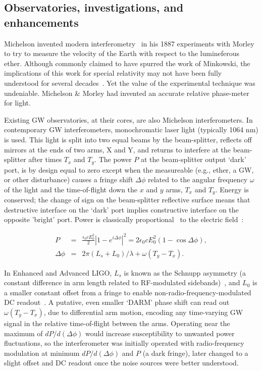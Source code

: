 
        \subsection{Observatories, investigations, and enhancements}
        \label{methods}

	Michelson invented modern interferometry~\cite{michelson} in his 1887 experiments with Morley to try to measure the velocity of the Earth with respect to the lumineferous ether.
Although commonly claimed to have spurred the work of Minkowski, the implications of this work for special relativity may not have been fully understood for several decades~\cite{CollinsGravityGhost}.
Yet the value of the experimental technique was undeniable.
Michelson \& Morley had invented an accurate relative phase-meter for light.

Existing GW observatories, at their cores, are also Michelson interferometers. 
In contemporary GW interferometers, monochromatic laser light (typically 1064 nm) is used.
This light is split into two equal beams by the beam-splitter, reflects off mirrors at the ends of two arms, X and Y, and returns to interfere at the beam-splitter after times $T_x$ and $T_y$.
The power $P$ at the beam-splitter output `dark' port, is by design equal to zero except when the measureable (e.g., ether, a GW, or other disturbance) causes a fringe shift $\Delta \phi$ related to the angular frequency $\omega$ of the light and the time-of-flight down the $x$ and $y$ arms, $T_x$ and $T_y$. 
Energy is conserved; the change of sign on the beam-splitter reflective surface means that destructive interface on the `dark' port implies constructive interface on the opposite 'bright' port.
Power is classically proportional~\cite{JacksonEM} to the electric field~\cite{Saulson}:

\begin{eqnarray}
P &=& \frac{\epsilon_0 c E_0^2}{2} \left| 1 - e^{i \Delta \phi}\right|^2 = 2 \epsilon_0 c E_0^2 (1 - \cos \Delta {\phi}),
\label{michelson-interferometry-eq}\\
\Delta \phi &=& 2\pi (L_s + L_0) /\lambda + \omega (T_y - T_x).
\end{eqnarray}

In Enhanced and Advanced LIGO, $L_s$ is known as the Schnupp asymmetry (a constant difference in arm length related to RF-modulated sidebands)~\cite{AdhikariThesis}, and $L_0$ is a smaller constant offset from a fringe to enable non-radio-frequency-modulated DC readout~\cite{FrickeThesis}.
A putative, even smaller `DARM' phase shift can read out $\omega (T_y -T_x)$, due to differential arm motion, encoding any time-varying GW signal in the relative time-of-flight between the arms. 
Operating near the maximum of $dP/d(\Delta\phi)$ would increase susceptibility to unwanted power fluctuations, so the interferometer was initially operated with radio-frequency modulation at minimum $dP/d(\Delta\phi)$ and  $P$ (a dark fringe), later changed to a slight offset and DC readout once the noise sources were better understood.

